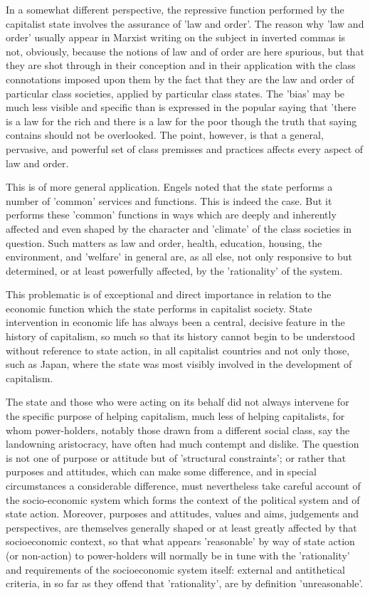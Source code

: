 In a somewhat different perspective, the repressive function performed by the capitalist state involves the assurance of 'law and order'. The reason why 'law and order' usually appear in Marxist writing on the subject in inverted commas is not, obviously, because the notions of law and of order are here spurious, but that they are shot through in their conception and in their application with the class connotations imposed upon them by the fact that they are the law and order of particular class societies, applied by particular class states. The 'bias' may be much less visible and specific than is expressed in the popular saying that 'there is a law for the rich and there is a law for the poor though the truth that saying contains should not be overlooked. The point, however, is that a general, pervasive, and powerful set of class premisses and practices affects every aspect of law and order.

This is of more general application. Engels noted that the state performs a number of 'common' services and functions. This is indeed the case. But it performs these 'common' functions in ways which are deeply and inherently affected and even shaped by the character and 'climate' of the class societies in question. Such matters as law and order, health, education, housing, the environment, and 'welfare' in general are, as all else, not only responsive to but determined, or at least powerfully affected, by the 'rationality' of the system.

This problematic is of exceptional and direct importance in relation to the economic function which the state performs in  capitalist society. State intervention in economic life has always been a central, decisive feature in the history of capitalism, so much so that its history cannot begin to be understood without reference to state action, in all capitalist countries and not only those, such as Japan, where the state was most visibly involved in the development of capitalism.

The state and those who were acting on its behalf did not always intervene for the specific purpose of helping capitalism, much less of helping capitalists, for whom power\hyp{}holders, notably those drawn from a different social class, say the landowning aristocracy, have often had much contempt and dislike. The question is not one of purpose or attitude but of 'structural constraints'; or rather that purposes and attitudes, which can make some difference, and in special circumstances a considerable difference, must nevertheless take careful account of the socio\hyp{}economic system which forms the context of the political system and of state action. Moreover, purposes and attitudes, values and aims, judgements and perspectives, are themselves generally shaped or at least greatly affected by that socioeconomic context, so that what appears 'reasonable' by way of state action (or non\hyp{}action) to power-holders will normally be in tune with the 'rationality' and requirements of the socioeconomic system itself: external and antithetical criteria, in so far as they offend that 'rationality', are by definition 'unreasonable'.


